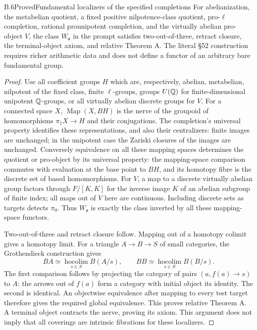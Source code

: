 \begin{statement}{B.6}{Proved}{Fundamental localizers of the specified completions}
For abelianization, the metabelian quotient, a fixed positive
nilpotence-class quotient, pro-$\ell$ completion, rational
prounipotent completion, and the virtually abelian pro-object
$V$, the class $W_{\mathfrak a}$ in the
prompt satisfies two-out-of-three, retract closure, the
terminal-object axiom, and relative Theorem A. The literal
\S52 construction requires richer arithmetic data and does not
define a functor of an arbitrary bare fundamental group.
\end{statement}
\begin{proof}
Use all coefficient groups $H$ which are, respectively, abelian,
metabelian, nilpotent of the fixed class, finite $\ell$-groups,
groups $U(\mathbb Q)$ for finite-dimensional unipotent $\mathbb Q$-groups,
or all virtually abelian discrete groups for $V$.
For a connected space $X$, $\operatorname{Map}(X,BH)$ is the
nerve of the groupoid of homomorphisms $\pi_1X\to H$ and their
conjugations. The completion's universal property identifies
these representations, and also their centralizers: finite
images are unchanged; in the unipotent case the Zariski closures
of the images are unchanged. Conversely equivalence on all
these mapping spaces determines the quotient or pro-object by
its universal property: the mapping-space comparison commutes
with evaluation at the base point to $BH$, and its homotopy
fibre is the discrete set of based homomorphisms. For $V$,
a map to a discrete virtually abelian group factors through
$F/[K,K]$ for the inverse image $K$ of an abelian subgroup
of finite index; all maps out of $V$ here are continuous.
Including discrete sets as targets
detects $\pi_0$. Thus $W_{\mathfrak a}$ is exactly the class
inverted by all these mapping-space functors.

Two-out-of-three and retract closure follow. Mapping out of a
homotopy colimit gives a homotopy limit. For a triangle
$A\to B\to S$ of small categories, the Grothendieck construction
gives
\[
 BA\simeq\operatorname*{hocolim}_{s\in S}B(A/s),\qquad
 BB\simeq\operatorname*{hocolim}_{s\in S}B(B/s).
\]
The first comparison follows by projecting the category of
pairs $(a,f(a)\to s)$ to $A$: the arrows out of $f(a)$ form
a category with initial object its identity. The second is
identical. An objectwise equivalence after mapping to every
test target therefore gives the required global equivalence.
This proves relative Theorem A. A terminal object contracts the
nerve, proving its axiom. This argument does not imply that all
coverings are intrinsic fibrations for these localizers.
\end{proof}

